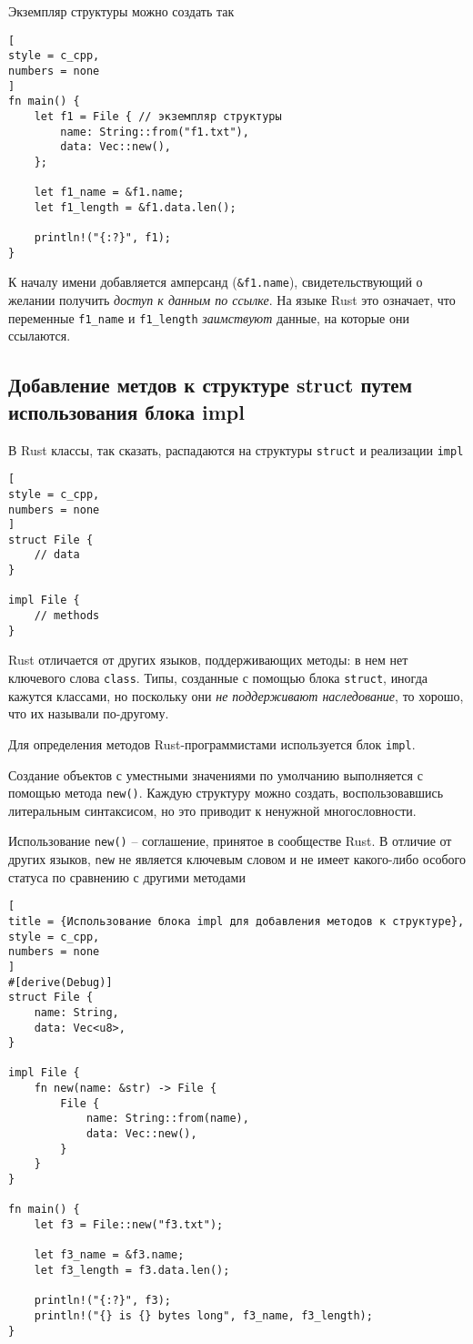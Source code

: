 \documentclass[%
	11pt,
	a4paper,
	utf8,
		]{article}
\begin{document}
Экземпляр структуры можно создать так
\begin{lstlisting}[
style = c_cpp,
numbers = none
]
fn main() {
    let f1 = File { // экземпляр структуры
        name: String::from("f1.txt"),
        data: Vec::new(),
    };

    let f1_name = &f1.name;
    let f1_length = &f1.data.len();
    
    println!("{:?}", f1);
}
\end{lstlisting}

К началу имени добавляется амперсанд (\verb|&f1.name|), свидетельствующий о желании получить \emph{доступ к данным по ссылке}. На языке Rust это означает, что переменные \verb|f1_name| и \verb|f1_length| \emph{заимствуют} данные, на которые они ссылаются.

\subsection{Добавление метдов к структуре struct путем использования блока impl}

В Rust классы, так сказать, распадаются на структуры \texttt{struct} и реализации \texttt{impl}
\begin{lstlisting}[
style = c_cpp,
numbers = none
]
struct File {
    // data
}

impl File {
    // methods
}
\end{lstlisting}

Rust отличается от других языков, поддерживающих методы: в нем нет ключевого слова \texttt{class}. Типы, созданные с помощью блока \texttt{struct}, иногда кажутся классами, но поскольку они \emph{не поддерживают наследование}, то хорошо, что их называли по-другому.

Для определения методов Rust-программистами используется блок \texttt{impl}.

Создание объектов с уместными значениями по умолчанию выполняется с помощью метода \texttt{new()}. Каждую структуру можно создать, воспользовавшись литеральным синтаксисом, но это приводит к ненужной многословности.

Использование \texttt{new()} -- соглашение, принятое в сообществе Rust. В отличие от других языков, \texttt{new} не является ключевым словом и не имеет какого-либо особого статуса по сравнению с другими методами
\begin{lstlisting}[
title = {Использование блока impl для добавления методов к структуре},
style = c_cpp,
numbers = none
]
#[derive(Debug)]
struct File {
    name: String,
    data: Vec<u8>,
}

impl File {
    fn new(name: &str) -> File {
        File {
            name: String::from(name),
            data: Vec::new(),
        }
    }
}

fn main() {
    let f3 = File::new("f3.txt");
    
    let f3_name = &f3.name;
    let f3_length = f3.data.len();
    
    println!("{:?}", f3);
    println!("{} is {} bytes long", f3_name, f3_length);
}
\end{lstlisting}
\end{document}
